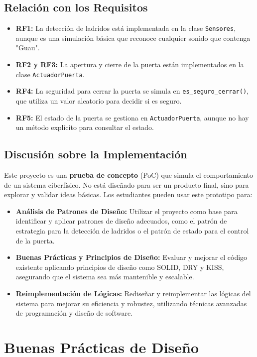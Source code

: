 \subsection{Relación con los Requisitos}

\begin{itemize}
    \item \textbf{RF1:} La detección de ladridos está implementada en la clase \texttt{Sensores}, aunque es una simulación básica que reconoce cualquier sonido que contenga "Guau".
    \item \textbf{RF2 y RF3:} La apertura y cierre de la puerta están implementados en la clase \texttt{ActuadorPuerta}.
    \item \textbf{RF4:} La seguridad para cerrar la puerta se simula en \texttt{es\_seguro\_cerrar()}, que utiliza un valor aleatorio para decidir si es seguro.
    \item \textbf{RF5:} El estado de la puerta se gestiona en \texttt{ActuadorPuerta}, aunque no hay un método explícito para consultar el estado.
\end{itemize}

\subsection{Discusión sobre la Implementación}

Este proyecto es una \textbf{prueba de concepto} (PoC) que simula el comportamiento de un sistema ciberfísico. No está diseñado para ser un producto final, sino para explorar y validar ideas básicas. Los estudiantes pueden usar este prototipo para:
\begin{itemize}
    \item \textbf{Análisis de Patrones de Diseño:} Utilizar el proyecto como base para identificar y aplicar patrones de diseño adecuados, como el patrón de estrategia para la detección de ladridos o el patrón de estado para el control de la puerta.
    \item \textbf{Buenas Prácticas y Principios de Diseño:} Evaluar y mejorar el código existente aplicando principios de diseño como SOLID, DRY y KISS, asegurando que el sistema sea más mantenible y escalable.
    \item \textbf{Reimplementación de Lógicas:} Rediseñar y reimplementar las lógicas del sistema para mejorar su eficiencia y robustez, utilizando técnicas avanzadas de programación y diseño de software.
\end{itemize}

\section{Buenas Prácticas de Diseño}

